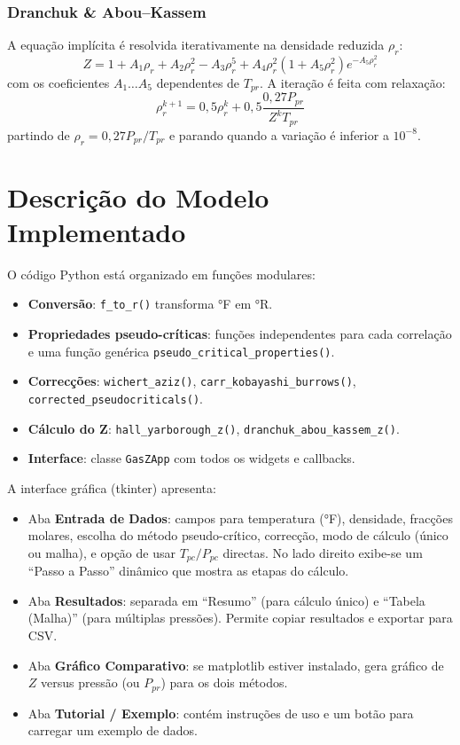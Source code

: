 \documentclass[a4paper,12pt]{article}
\begin{document}
\subsubsection{Dranchuk \& Abou–Kassem}
A equação implícita é resolvida iterativamente na densidade reduzida \(\rho_r\):
\begin{equation}
    Z = 1 + A_1\rho_r + A_2\rho_r^2 - A_3\rho_r^5 + A_4\rho_r^2(1+A_5\rho_r^2)e^{-A_5\rho_r^2}
\end{equation}
com os coeficientes \(A_1\ldots A_5\) dependentes de \(T_{pr}\). A iteração é feita com relaxação:
\begin{equation}
    \rho_r^{k+1} = 0{,}5\rho_r^{k} + 0{,}5\frac{0{,}27P_{pr}}{Z^{k}T_{pr}}
\end{equation}
partindo de \(\rho_r = 0{,}27P_{pr}/T_{pr}\) e parando quando a variação é inferior a \(10^{-8}\).

\section{Descrição do Modelo Implementado}
O código Python está organizado em funções modulares:
\begin{itemize}
    \item \textbf{Conversão}: \texttt{f\_to\_r()} transforma °F em °R.
    \item \textbf{Propriedades pseudo-críticas}: funções independentes para cada correlação e uma função genérica \texttt{pseudo\_critical\_properties()}.
    \item \textbf{Correcções}: \texttt{wichert\_aziz()}, \texttt{carr\_kobayashi\_burrows()}, \texttt{corrected\_pseudocriticals()}.
    \item \textbf{Cálculo do Z}: \texttt{hall\_yarborough\_z()}, \texttt{dranchuk\_abou\_kassem\_z()}.
    \item \textbf{Interface}: classe \texttt{GasZApp} com todos os widgets e callbacks.
\end{itemize}

A interface gráfica (tkinter) apresenta:
\begin{itemize}
    \item Aba \textbf{Entrada de Dados}: campos para temperatura (°F), densidade, fracções molares, escolha do método pseudo-crítico, correcção, modo de cálculo (único ou malha), e opção de usar \(T_{pc}/P_{pc}\) directas. No lado direito exibe-se um “Passo a Passo” dinâmico que mostra as etapas do cálculo.
    \item Aba \textbf{Resultados}: separada em “Resumo” (para cálculo único) e “Tabela (Malha)” (para múltiplas pressões). Permite copiar resultados e exportar para CSV.
    \item Aba \textbf{Gráfico Comparativo}: se matplotlib estiver instalado, gera gráfico de \(Z\) versus pressão (ou \(P_{pr}\)) para os dois métodos.
    \item Aba \textbf{Tutorial / Exemplo}: contém instruções de uso e um botão para carregar um exemplo de dados.
\end{itemize}
\end{document}
